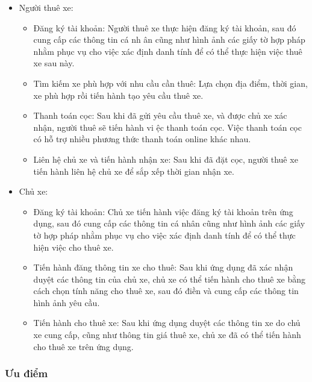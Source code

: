 \documentclass[../main.tex]{subfiles}
\begin{document}
	\begin{itemize}
		\item Người thuê xe:
		\begin{itemize}
			\item Đăng ký tài khoản: Người thuê xe thực hiện đăng ký tài khoản, sau đó cung cấp các thông tin cá nh
			ân cũng như hình ảnh các giấy tờ hợp pháp nhằm phục vụ cho việc xác định danh tính để có thể thực hiện
			việc thuê xe sau này.
			\item Tìm kiếm xe phù hợp với nhu cầu cần thuê: Lựa chọn địa điểm, thời gian, xe phù hợp rồi tiến hành
			tạo yêu cầu thuê xe.
			\item Thanh toán cọc: Sau khi đã gửi yêu cầu thuê xe, và được chủ xe xác nhận, người thuê sẽ tiến hành
			vi ệc thanh toán cọc. Việc thanh toán cọc có hỗ trợ nhiều phương thức thanh toán online khác nhau.
			\item Liên hệ chủ xe và tiến hành nhận xe: Sau khi đã đặt cọc, người thuê xe tiến hành liên hệ chủ xe để
			sắp xếp thời gian nhận xe.
		\end{itemize}

		\item Chủ xe:
		\begin{itemize}
			\item Đăng ký tài khoản: Chủ xe tiến hành việc đăng ký tài khoản trên ứng dụng, sau đó cung cấp các
			thông tin cá nhân cũng như hình ảnh các giấy tờ hợp pháp nhằm phục vụ cho việc xác định danh tính để có
			thể thực hiện việc cho thuê xe.
			\item Tiến hành đăng thông tin xe cho thuê: Sau khi ứng dụng đã xác nhận duyệt các thông tin của chủ xe,
			chủ xe có thể tiến hành cho thuê xe bằng cách chọn tính năng cho thuê xe, sau đó điền và cung cấp các
			thông tin hình ảnh yêu cầu.
			\item Tiến hành cho thuê xe: Sau khi ứng dụng duyệt các thông tin xe do chủ xe cung cấp, cũng như thông
			tin giá thuê xe, chủ xe đã có thể tiến hành cho thuê xe trên ứng dụng.
		\end{itemize}
	\end{itemize}

	\subsubsection{Ưu điểm}
\end{document}
